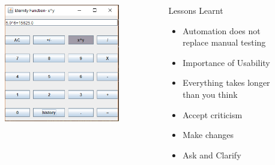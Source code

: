 \documentclass[final]{beamer}
\newlength{\sepwid}
\newlength{\onecolwid}
\newlength{\twocolwid}
\begin{document}
\begin{frame}
\begin{columns}[t]
\begin{column}{\onecolwid}
\begin{figure}
\includegraphics[width=0.8\linewidth]{d2.PNG}
\end{figure}


\end{column} %

\begin{column}{\sepwid}\end{column} %

\begin{column}{\twocolwid} %

\begin{columns}[t,totalwidth=\twocolwid] %

\begin{column}{\onecolwid}\vspace{-.74in} %


\begin{exampleblock}{Lessons Learnt}

\begin{itemize}
\item Automation does not replace manual testing
\item Importance of Usability
\item Everything takes longer than you think
\item Accept criticism
\item Make changes
\item Ask and Clarify
\end{itemize}
\end{exampleblock}


\end{column}
\end{columns}
\end{column}
\end{columns}
\end{frame}
\end{document}
